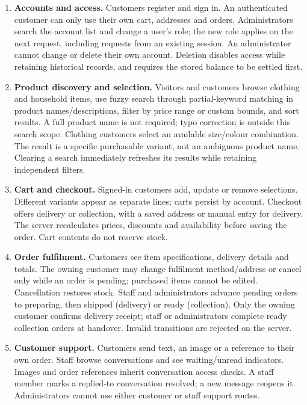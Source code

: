 \documentclass[11pt,a4paper]{article}
\begin{document}
\begin{enumerate}
\item \textbf{Accounts and access.} Customers register and sign in. An authenticated customer can only use their own cart, addresses and orders. Administrators search the account list and change a user's role; the new role applies on the next request, including requests from an existing session. An administrator cannot change or delete their own account. Deletion disables access while retaining historical records, and requires the stored balance to be settled first.
\item \textbf{Product discovery and selection.} Visitors and customers browse clothing and household items, use fuzzy search through partial-keyword matching in product names/descriptions, filter by price range or custom bounds, and sort results. A full product name is not required; typo correction is outside this search scope. Clothing customers select an available size/colour combination. The result is a specific purchasable variant, not an ambiguous product name. Clearing a search immediately refreshes its results while retaining independent filters.
\item \textbf{Cart and checkout.} Signed-in customers add, update or remove selections. Different variants appear as separate lines; carts persist by account. Checkout offers delivery or collection, with a saved address or manual entry for delivery. The server recalculates prices, discounts and availability before saving the order. Cart contents do not reserve stock.
\item \textbf{Order fulfilment.} Customers see item specifications, delivery details and totals. The owning customer may change fulfilment method/address or cancel only while an order is pending; purchased items cannot be edited. Cancellation restores stock. Staff and administrators advance pending orders to preparing, then shipped (delivery) or ready (collection). Only the owning customer confirms delivery receipt; staff or administrators complete ready collection orders at handover. Invalid transitions are rejected on the server.
\item \textbf{Customer support.} Customers send text, an image or a reference to their own order. Staff browse conversations and see waiting/unread indicators. Images and order references inherit conversation access checks. A staff member marks a replied-to conversation resolved; a new message reopens it. Administrators cannot use either customer or staff support routes.
\end{enumerate}
\end{document}
